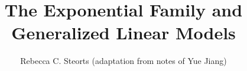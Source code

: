 \documentclass{beamer}
\title{The Exponential Family and \\ Generalized Linear Models}
\author{Rebecca C. Steorts (adaptation from notes of Yue Jiang)}
\begin{document}
\begin{frame}
  \titlepage
\end{frame}

%
%
%
%
%
%
%
%
%
%
%
%
%
%
%
%
%
%
%
%
%
%

\end{document}
